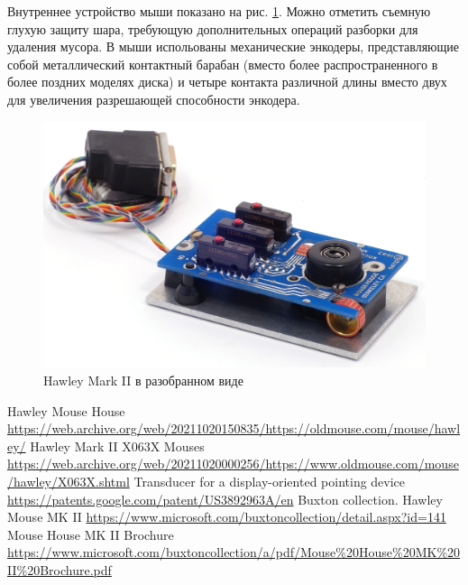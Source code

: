 \documentclass[11pt, a4paper]{article}
\begin{document}
Внутреннее устройство мыши показано на рис. \ref{fig:HawleyMarkIIInside}. Можно отметить съемную глухую защиту шара, требующую дополнительных операций разборки для удаления мусора. В мыши испольованы механические энкодеры, представляющие собой металлический контактный барабан (вместо более распространенного в более поздних моделях диска) и четыре контакта различной длины вместо двух для увеличения разрешающей способности энкодера.

 \begin{figure}[h]
    \centering
    \includegraphics[scale=0.8]{1983_hawley_mark_ii/inside_60.jpg}
    \caption{Hawley Mark II в разобранном виде}
    \label{fig:HawleyMarkIIInside}
\end{figure}

\begin{thebibliography}{9}
 Hawley Mouse House \url{https://web.archive.org/web/20211020150835/https://oldmouse.com/mouse/hawley/}
 Hawley Mark II X063X Mouses \url{https://web.archive.org/web/20211020000256/https://www.oldmouse.com/mouse/hawley/X063X.shtml}
 Transducer for a display-oriented pointing device \url{https://patents.google.com/patent/US3892963A/en}
 Buxton collection. Hawley Mouse MK II \url{https://www.microsoft.com/buxtoncollection/detail.aspx?id=141}
 Mouse House MK II Brochure \url{https://www.microsoft.com/buxtoncollection/a/pdf/Mouse%20House%20MK%20II%20Brochure.pdf}
\end{thebibliography}
\end{document}
